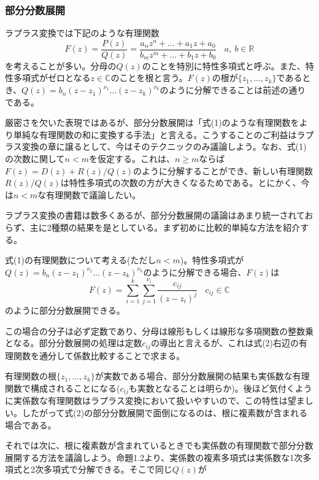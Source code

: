 \documentclass[dvipdfmx, 9pt, a4paper]{jsarticle}
\begin{document}
\subsubsection{部分分数展開}
ラプラス変換では下記のような有理関数
\begin{equation}
F(z)=\frac{P(z)}{Q(z)}=\frac{a_nz^n+...+a_1z+a_0}{b_mz^m+...+b_1z+b_0}~~~~a,~b \in \mathbb{R}
\end{equation}
を考えることが多い。分母の$Q(z)$のことを特別に特性多項式と呼ぶ。また、特性多項式がゼロとなる$z \in \mathbb{C}$のことを根と言う。$F(z)$の根が$\{ z_1, ..., z_k\}$であるとき、$Q(z)=b_n(z-z_1)^{\nu_1}...(z-z_k)^{\nu_k}$のように分解できることは前述の通りである。\par
厳密さを欠いた表現ではあるが、部分分数展開は「式(1)のような有理関数をより単純な有理関数の和に変換する手法」と言える。こうすることのご利益はラプラス変換の章に譲るとして、今はそのテクニックのみ議論しよう。なお、式(1)の次数に関して$n<m$を仮定する。これは、$n\geq m$ならば$F(z)=D(z)+R(z)/Q(z)$のように分解することができ、新しい有理関数$R(z)/Q(z)$は特性多項式の次数の方が大きくなるためである。とにかく、今は$n<m$な有理関数で議論したい。\par
ラプラス変換の書籍は数多くあるが、部分分数展開の議論はあまり統一されておらず、主に2種類の結果を是としている。まず初めに比較的単純な方法を紹介する。
\begin{tcolorbox}[title=部分分数展開(係数が複素数となり得る方法)]
式(1)の有理関数について考える(ただし$n<m$)。特性多項式が$Q(z)=b_n(z-z_1)^{\nu_1}...(z-z_k)^{\nu_k}$のように分解できる場合、$F(z)$は
\begin{equation}
F(z)=\sum_{i=1}^k\sum_{j=1}^{\nu_i}\frac{c_{ij}}{(z-z_i)^j}~~~~c_{ij} \in \mathbb{C}
\end{equation}
のように部分分数展開できる。
\end{tcolorbox}
この場合の分子は必ず定数であり、分母は線形もしくは線形な多項関数の整数乗となる。部分分数展開の処理は定数$c_{ij}$の導出と言えるが、これは式(2)右辺の有理関数を通分して係数比較することで求まる。\par
有理関数の根$\{ z_1, ..., z_k\}$が実数である場合、部分分数展開の結果も実係数な有理関数で構成されることになる($c_{ij}$も実数となることは明らか)。後ほど気付くように実係数な有理関数はラプラス変換において扱いやすいので、この特性は望ましい。したがって式(2)の部分分数展開で面倒になるのは、根に複素数が含まれる場合である。\par
それでは次に、根に複素数が含まれているときでも実係数の有理関数で部分分数展開する方法を議論しよう。命題1.2より、実係数の複素多項式は実係数な1次多項式と2次多項式で分解できる。そこで同じ$Q(z)$が
\end{document}
